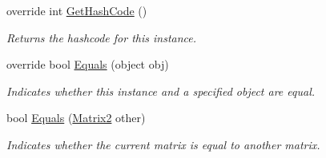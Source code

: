 \begin{DoxyCompactItemize}
override int \hyperlink{struct_open_t_k_1_1_matrix2_acd6cfac90bdf6c70f52a17ea469edaf5}{Get\-Hash\-Code} ()
\begin{DoxyCompactList}\small\item\em Returns the hashcode for this instance. \end{DoxyCompactList}\item 
override bool \hyperlink{struct_open_t_k_1_1_matrix2_a0295be986c376f9fd3ce10c595f28783}{Equals} (object obj)
\begin{DoxyCompactList}\small\item\em Indicates whether this instance and a specified object are equal. \end{DoxyCompactList}\item 
bool \hyperlink{struct_open_t_k_1_1_matrix2_ab9a20399b22c7ada439665a4a1a9ffc5}{Equals} (\hyperlink{struct_open_t_k_1_1_matrix2}{Matrix2} other)
\begin{DoxyCompactList}\small\item\em Indicates whether the current matrix is equal to another matrix.\end{DoxyCompactList}\end{DoxyCompactItemize}
